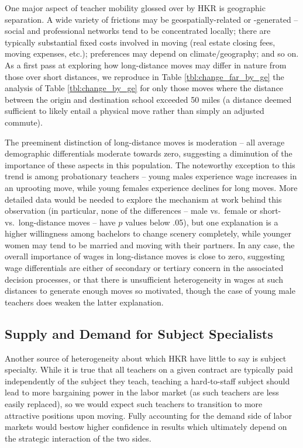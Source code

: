 \documentclass[12pt,]{article}
\begin{document}
One major aspect of teacher mobility glossed over by HKR is geographic
separation. A wide variety of frictions may be geospatially-related or
-generated -- social and professional networks tend to be concentrated
locally; there are typically substantial fixed costs involved in moving
(real estate closing fees, moving expenses, etc.); preferences may
depend on climate/geography; and so on. As a first pass at exploring how
long-distance moves may differ in nature from those over short
distances, we reproduce in Table \ref{tbl:change_far_by_ge} the analysis
of Table \ref{tbl:change_by_ge} for only those moves where the distance
between the origin and destination school exceeded 50 miles (a distance
deemed sufficient to likely entail a physical move rather than simply an
adjusted commute).

The preeminent distinction of long-distance moves is moderation -- all
average demographic differentials moderate towards zero, suggesting a
diminution of the importance of these aspects in this population. The
noteworthy exception to this trend is among probationary teachers --
young males experience wage increases in an uprooting move, while young
females experience declines for long moves. More detailed data would be
needed to explore the mechanism at work behind this observation (in
particular, none of the differences -- male vs.~female or short-
vs.~long-distance moves -- have \(p\) values below .05), but one
explanation is a higher willingness among bachelors to change scenery
completely, while younger women may tend to be married and moving with
their partners. In any case, the overall importance of wages in
long-distance moves is close to zero, suggesting wage differentials are
either of secondary or tertiary concern in the associated decision
processes, or that there is unsufficient heterogeneity in wages at such
distances to generate enough moves so motivated, though the case of
young male teachers does weaken the latter explanation.

\subsection{Supply and Demand for Subject
Specialists}\label{supply-and-demand-for-subject-specialists}

Another source of heterogeneity about which HKR have little to say is
subject specialty. While it is true that all teachers on a given
contract are typically paid independently of the subject they teach,
teaching a hard-to-staff subject should lead to more bargaining power in
the labor market (as such teachers are less easily replaced), so we
would expect such teachers to transition to more attractive positions
upon moving. Fully accounting for the demand side of labor markets would
bestow higher confidence in results which ultimately depend on the
strategic interaction of the two sides.
\end{document}
